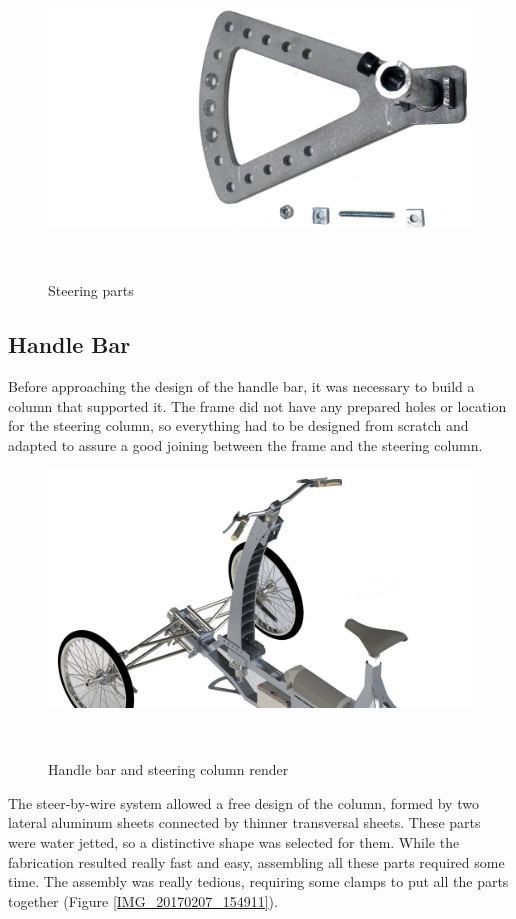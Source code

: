 \begin{figure}[h!]
	\includegraphics[width=0.7\linewidth]{figs/05/IMG_20170403_011512}
	\caption{Steering parts}
	\label{IMG_20170403_011512}
	\\[-5cm]
\end{figure}

\newpage
\subsection{Handle Bar}

Before approaching the design of the handle bar, it was necessary to build a column that supported it. The frame did not have any prepared holes or location for the steering column, so everything had to be designed from scratch and adapted to assure a good joining between the frame and the steering column.

\begin{figure}[h!]
	\includegraphics[width=1\linewidth]{figs/05/Render_Design_B_7}
	\caption{Handle bar and steering column render}
	\\[-1cm]
\end{figure}

The steer-by-wire system allowed a free design of the column, formed by two lateral aluminum sheets connected by thinner transversal sheets. These parts were water jetted, so a distinctive shape was selected for them. While the fabrication resulted really fast and easy, assembling all these parts required some time. The assembly was really tedious, requiring some clamps to put all the parts together (Figure \ref{IMG_20170207_154911}).

